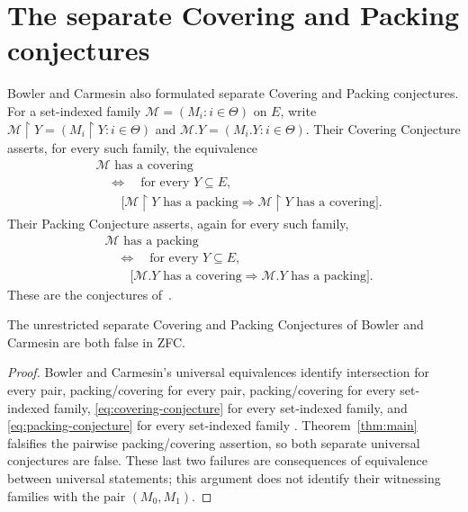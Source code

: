 \section{The separate Covering and Packing conjectures}
\label{sec:separate-consequences}

Bowler and Carmesin also formulated separate Covering and Packing
conjectures. For a set-indexed family $\mathcal M=(M_i:i\in\Theta)$ on $E$,
write $\mathcal M\!\upharpoonright Y=(M_i\!\upharpoonright Y:i\in\Theta)$
and $\mathcal M.Y=(M_i.Y:i\in\Theta)$. Their Covering Conjecture asserts,
for every such family, the equivalence
\begin{equation}\label{eq:covering-conjecture}
\begin{aligned}
 &\mathcal M\text{ has a covering}\\
 &\quad\Longleftrightarrow\quad
 \text{for every }Y\subseteq E,\\
 &\qquad\bigl[\mathcal M\!\upharpoonright Y\text{ has a packing}
 \Longrightarrow
 \mathcal M\!\upharpoonright Y\text{ has a covering}\bigr].
\end{aligned}
\end{equation}
Their Packing Conjecture asserts, again for every such family,
\begin{equation}\label{eq:packing-conjecture}
\begin{aligned}
 &\mathcal M\text{ has a packing}\\
 &\quad\Longleftrightarrow\quad
 \text{for every }Y\subseteq E,\\
 &\qquad\bigl[\mathcal M.Y\text{ has a covering}
 \Longrightarrow
 \mathcal M.Y\text{ has a packing}\bigr].
\end{aligned}
\end{equation}
These are the conjectures of~\cite[Conjectures~5.2 and~6.3]{BowlerCarmesin2015}.

\begin{corollary}\label{cor:separate-covering-packing}
The unrestricted separate Covering and Packing Conjectures of Bowler and
Carmesin are both false in ZFC.
\end{corollary}

\begin{proof}
Bowler and Carmesin's universal equivalences identify intersection for
every pair, packing/covering for every pair, packing/covering for every
set-indexed family, \eqref{eq:covering-conjecture} for every set-indexed
family, and \eqref{eq:packing-conjecture} for every set-indexed family
\cite[Section~7]{BowlerCarmesin2015}. Theorem~\ref{thm:main} falsifies the
pairwise packing/covering assertion, so both separate universal conjectures
are false. These last two failures are consequences of equivalence between
universal statements; this argument does not identify their witnessing
families with the pair $(M_0,M_1)$.
\end{proof}

